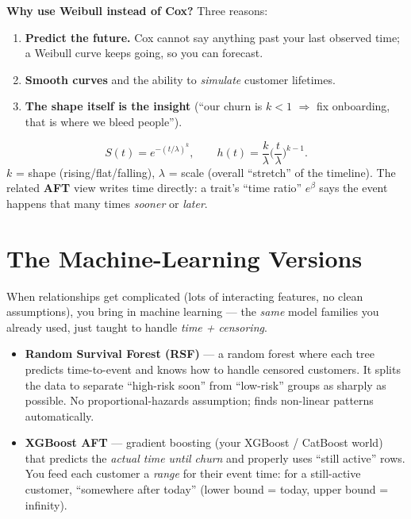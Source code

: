 \documentclass[11pt]{article}
\begin{document}
\textbf{Why use Weibull instead of Cox?} Three reasons:
\begin{enumerate}[leftmargin=1.5em]
  \item \textbf{Predict the future.} Cox cannot say anything past your last observed time; a Weibull
  curve keeps going, so you can forecast.
  \item \textbf{Smooth curves} and the ability to \emph{simulate} customer lifetimes.
  \item \textbf{The shape itself is the insight} (``our churn is $k<1$ $\Rightarrow$ fix onboarding,
  that is where we bleed people'').
\end{enumerate}

\begin{mathbox}
$$S(t)=e^{-(t/\lambda)^k},\qquad h(t)=\frac{k}{\lambda}\Big(\frac{t}{\lambda}\Big)^{k-1}.$$
$k$ = shape (rising/flat/falling), $\lambda$ = scale (overall ``stretch'' of the timeline).
The related \textbf{AFT} view writes time directly: a trait's ``time ratio'' $e^{\beta}$ says the
event happens that many times \emph{sooner} or \emph{later}.
\end{mathbox}

\section{The Machine-Learning Versions}

When relationships get complicated (lots of interacting features, no clean assumptions), you bring
in machine learning --- the \emph{same} model families you already used, just taught to handle
\emph{time + censoring}.

\begin{itemize}[leftmargin=1.4em]
  \item \textbf{Random Survival Forest (RSF)} --- a random forest where each tree predicts
  time-to-event and knows how to handle censored customers. It splits the data to separate
  ``high-risk soon'' from ``low-risk'' groups as sharply as possible. No proportional-hazards
  assumption; finds non-linear patterns automatically.
  \item \textbf{XGBoost AFT} --- gradient boosting (your XGBoost / CatBoost world) that predicts the
  \emph{actual time until churn} and properly uses ``still active'' rows. You feed each customer a
  \emph{range} for their event time: for a still-active customer, ``somewhere after today''
  (lower bound = today, upper bound = infinity).
\end{itemize}
\end{document}
